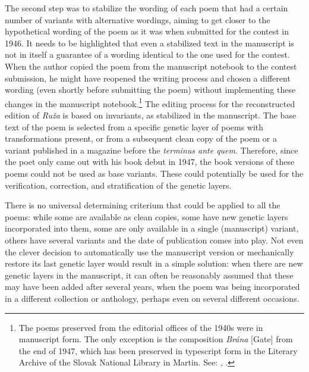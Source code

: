 \documentclass{article}
\begin{document}
The second step was to stabilize the wording of each poem that had
a certain number of variants with alternative wordings, aiming to get
closer to the hypothetical wording of the poem as it was when submitted
for the contest in 1946. It needs to be highlighted that even
a stabilized text in the manuscript is not in itself a guarantee of
a wording identical to the one used for the contest. When the author
copied the poem from the manuscript notebook to the contest submission,
he might have reopened the writing process and chosen a different
wording (even shortly before submitting the poem) without implementing
these changes in the manuscript notebook.\footnote{The poems preserved
  from the editorial offices of the 1940s were in manuscript form. The
  only exception is the composition \emph{Brána} [Gate] from the end of
  1947, which has been preserved in typescript form in the Literary
  Archive of the Slovak National Library in Martin. See: \cite{mihalik_brana_nodate}, .} The editing process for the reconstructed
edition of \emph{Ruža} is based on invariants, as stabilized in the
manuscript. The base text of the poem is selected from a specific
genetic layer of poems with transformations present, or from
a subsequent clean copy of the poem or a variant published in a magazine
before the \emph{terminus ante quem}. Therefore, since the poet only
came out with his book debut in 1947, the book versions of these poems could
not be used as base variants. These could potentially be used for the
verification, correction, and stratification of the genetic layers.

There is no universal determining criterium that could be applied to all
the poems: while some are available as clean copies, some have new
genetic layers incorporated into them, some are only available in
a single (manuscript) variant, others have several variants and the date
of publication comes into play. Not even the clever decision to
automatically use the manuscript version or mechanically restore its
last genetic layer would result in a simple solution: when there are new
genetic layers in the manuscript, it can often be reasonably assumed
that these may have been added after several years, when the poem was
being incorporated in a different collection or anthology, perhaps even
on several different occasions.
\end{document}
